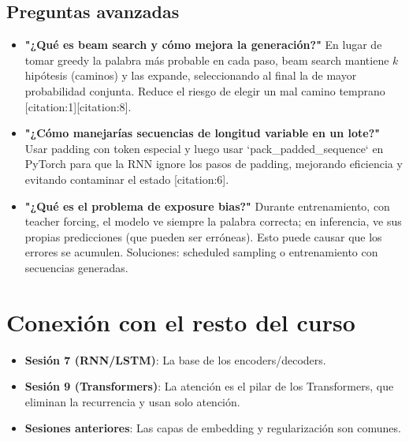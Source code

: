 \documentclass[12pt,a4paper,openany,oneside]{book}
\begin{document}
\subsection{Preguntas avanzadas}
\begin{itemize}
    \item \textbf{"¿Qué es beam search y cómo mejora la generación?"}
    En lugar de tomar greedy la palabra más probable en cada paso, beam search mantiene \(k\) hipótesis (caminos) y las expande, seleccionando al final la de mayor probabilidad conjunta. Reduce el riesgo de elegir un mal camino temprano [citation:1][citation:8].
    
    \item \textbf{"¿Cómo manejarías secuencias de longitud variable en un lote?"}
    Usar padding con token especial y luego usar `pack_padded_sequence` en PyTorch para que la RNN ignore los pasos de padding, mejorando eficiencia y evitando contaminar el estado [citation:6].
    
    \item \textbf{"¿Qué es el problema de exposure bias?"}
    Durante entrenamiento, con teacher forcing, el modelo ve siempre la palabra correcta; en inferencia, ve sus propias predicciones (que pueden ser erróneas). Esto puede causar que los errores se acumulen. Soluciones: scheduled sampling o entrenamiento con secuencias generadas.
\end{itemize}

\section{Conexión con el resto del curso}
\begin{itemize}
    \item \textbf{Sesión 7 (RNN/LSTM)}: La base de los encoders/decoders.
    \item \textbf{Sesión 9 (Transformers)}: La atención es el pilar de los Transformers, que eliminan la recurrencia y usan solo atención.
    \item \textbf{Sesiones anteriores}: Las capas de embedding y regularización son comunes.
\end{itemize}
\end{document}
